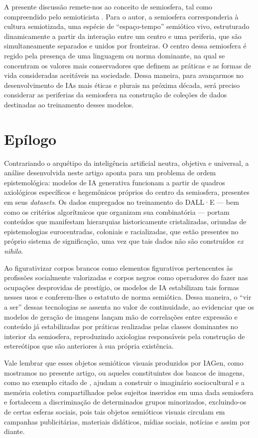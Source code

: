 \documentclass[portuguese]{textolivre}
\begin{document}
A presente discussão remete-nos ao conceito de semiosfera, tal como compreendido pelo semioticista \textcite{lotman2019semiosfera}. Para o autor, a semiosfera corresponderia à cultura semiotizada, uma espécie de “espaço-tempo” semiótico vivo, estruturado dinamicamente a partir da interação entre um centro e uma periferia, que são simultaneamente separados e unidos por fronteiras. O centro dessa semiosfera é regido pela presença de uma linguagem ou norma dominante, na qual se concentram os valores mais conservadores que definem as práticas e as formas de vida consideradas aceitáveis na sociedade. Dessa maneira, para avançarmos no desenvolvimento de IAs mais éticas e plurais na próxima década, será preciso considerar as periferias da semiosfera na construção de coleções de dados destinadas ao treinamento desses modelos.


\section{Epílogo}

Contrariando o arquétipo da inteligência artificial neutra, objetiva e universal, a análise desenvolvida neste artigo aponta para um problema de ordem epistemológica: modelos de IA generativa funcionam a partir de quadros axiológicos específicos e hegemônicos próprios do centro da semiosfera, presentes em seus \textit{datasets}. Os dados empregados no treinamento do DALL·E — bem como os critérios algorítmicos que organizam sua combinatória — portam conteúdos que manifestam hierarquias historicamente cristalizadas, oriundas de epistemologias eurocentradas, coloniais e racializadas, que estão presentes no próprio sistema de significação, uma vez que tais dados não são construídos \textit{ex nihilo}.

Ao figurativizar corpos brancos como elementos figurativos pertencentes às profissões socialmente valorizadas e corpos negros como operadores do fazer nas ocupações desprovidas de prestígio, os modelos de IA estabilizam tais formas nesses usos e conferem-lhes o estatuto de norma semiótica. Dessa maneira, o “vir a ser” dessas tecnologias se assenta no valor de continuidade, ao evidenciar que os modelos de geração de imagens lançam mão de correlações entre expressão e conteúdo já estabilizadas por práticas realizadas pelas classes dominantes no interior da semiosfera, reproduzindo axiologias responsáveis pela construção de estereótipos que são anteriores à sua própria existência.

Vale lembrar que esses objetos semióticos visuais produzidos por IAGen, como mostramos no presente artigo, ou aqueles constituintes dos bancos de imagens, como no exemplo citado de \textcite{moraes2025semioticista}, ajudam a construir o imaginário sociocultural e a memória coletiva compartilhados pelos sujeitos inseridos em uma dada semiosfera e fortalecem a discriminação de determinados grupos minorizados, excluindo-os de certas esferas sociais, pois tais objetos semióticos visuais circulam em campanhas publicitárias, materiais didáticos, mídias sociais, notícias e assim por diante.
\end{document}
